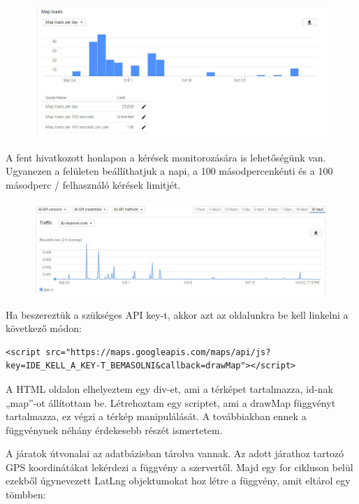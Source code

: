 \begin{figure}[htb]
\centering
\includegraphics[scale=0.5]{kepek/google_maps_api_1.jpg}
\caption{}
\label{fig:google_maps_api_1}
\end{figure}

A fent hivatkozott honlapon a kérések monitorozására is lehetőségünk van. Ugyanezen a felületen beállíthatjuk a napi, a 100 másodpercenkénti és a 100 másodperc / felhasználó kérések limitjét.

\begin{figure}[htb]
\centering
\includegraphics[scale=0.5]{kepek/google_maps_api_2.jpg}
\caption{}
\label{fig:google_maps_api_2}
\end{figure}

Ha beszereztük a szükséges API key-t, akkor azt az oldalunkra be kell linkelni a következő módon:

\begin{verbatim}
<script src="https://maps.googleapis.com/maps/api/js?key=IDE_KELL_A_KEY-T_BEMASOLNI&callback=drawMap"></script>
\end{verbatim}

A HTML oldalon elhelyeztem egy div-et, ami a térképet tartalmazza, id-nak „map”-ot állítottam be. Létrehoztam egy scriptet, ami a drawMap függvényt tartalmazza, ez végzi a térkép manipulálását. A továbbiakban ennek a függvénynek néhány érdekesebb részét ismertetem.

A járatok útvonalai az adatbázisban tárolva vannak. Az adott járathoz tartozó GPS koordinátákat lekérdezi a függvény a szervertől. Majd egy for cikluson belül ezekből úgynevezett LatLng objektumokat hoz létre a függvény, amit eltárol egy tömbben:

